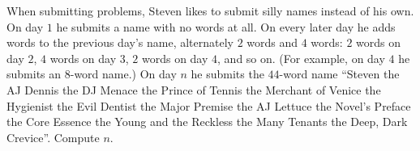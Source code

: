 When submitting problems, Steven likes to submit silly names instead of his own. On day $1$ he submits a name with no words at all. On every later day he adds words to the previous day's name, alternately $2$ words and $4$ words: $2$ words on day $2$, $4$ words on day $3$, $2$ words on day $4$, and so on. (For example, on day $4$ he submits an $8$-word name.) On day $n$ he submits the $44$-word name
``Steven the AJ Dennis the DJ Menace the Prince of Tennis the Merchant of Venice the Hygienist the Evil Dentist the Major Premise the AJ Lettuce the Novel's Preface the Core Essence the Young and the Reckless the Many Tenants the Deep, Dark Crevice''.
Compute $n$.
